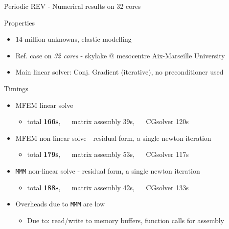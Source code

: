 \documentclass{beamer}
\newcommand{\mmm}{\texttt{MMM}}
\begin{document}
\begin{frame}{Periodic
    REV - Numerical results on 32 cores}
  \begin{block}{Properties}
    \begin{itemize}
      \item 14 million unknowns, elastic modelling
      \item Ref. case on \emph{32 cores} - skylake @
      mesocentre Aix-Marseille University
      \item Main linear solver: Conj. Gradient (iterative),
      no preconditioner used
    \end{itemize}
  \end{block}
  \vspace*{2mm}
  \begin{block}{Timings}
    \begin{itemize}
      \item MFEM linear solve
      \begin{itemize}
        \item total \textbf{166s}, ~~ matrix assembly 39s,
        ~~ CGsolver 120s
      \end{itemize}
      \item MFEM non-linear solve - residual form, a single
      newton iteration
      \begin{itemize}
        \item total \textbf{179s}, ~~ matrix assembly 53s,
        ~~ CGsolver 117s
      \end{itemize}
      \item \mmm{} non-linear solve - residual form, a
      single newton iteration
      \begin{itemize}
        \item total \textbf{188s}, ~~ matrix assembly 42s,
        ~~ CGsolver 133s
      \end{itemize}
      \item Overheads due to \mmm{} are low
      \begin{itemize}
        \item Due to: read/write to memory buffers,
        function calls for assembly
      \end{itemize}
    \end{itemize}
  \end{block}
\end{frame}
\end{document}
